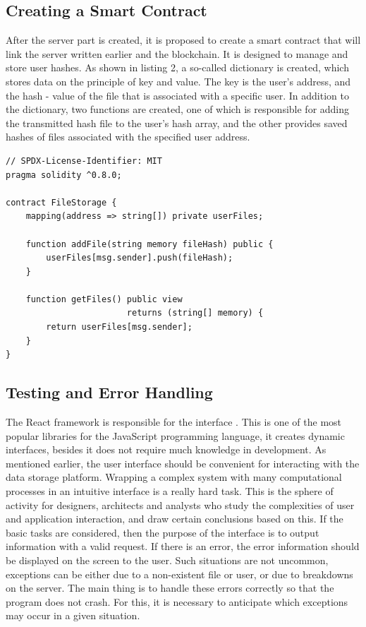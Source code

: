 \documentclass[10pt,conference,a4paper]{IEEEtran_EDM}
\begin{document}
\subsection{Creating a Smart Contract}
After the server part is created, it is proposed to create a smart contract that will link the server written earlier and the blockchain.
It is designed to manage and store user hashes.
As shown in listing 2, a so-called dictionary is created, which stores data on the principle of key and value.
The key is the user's address, and the hash - value of the file that is associated with a specific user.
In addition to the dictionary, two functions are created, one of which is responsible for adding the transmitted hash file to the user's hash array, and the other provides saved hashes of files associated with the specified user address.


\begin{lstlisting}[caption=Solidity code for a smart contract]
// SPDX-License-Identifier: MIT
pragma solidity ^0.8.0;

contract FileStorage {
    mapping(address => string[]) private userFiles;

    function addFile(string memory fileHash) public {
        userFiles[msg.sender].push(fileHash);
    }

    function getFiles() public view
                        returns (string[] memory) {
        return userFiles[msg.sender];
    }
}
\end{lstlisting}

\subsection{Testing and Error Handling}

The React framework is responsible for the interface \cite{Greg Lim}.
This is one of the most popular libraries for the JavaScript programming language, it creates dynamic interfaces, besides it does not require much knowledge in development.
As mentioned earlier, the user interface should be convenient for interacting with the data storage platform.
Wrapping a complex system with many computational processes in an intuitive interface is a really hard task.
This is the sphere of activity for designers, architects and analysts who study the complexities of user and application interaction, and draw certain conclusions based on this.
If the basic tasks are considered, then the purpose of the interface is to output information with a valid request.
If there is an error, the error information should be displayed on the screen to the user.
Such situations are not uncommon, exceptions can be either due to a non-existent file or user, or due to breakdowns on the server.
The main thing is to handle these errors correctly so that the program does not crash. For this, it is necessary to anticipate which exceptions may occur in a given situation.
\end{document}
